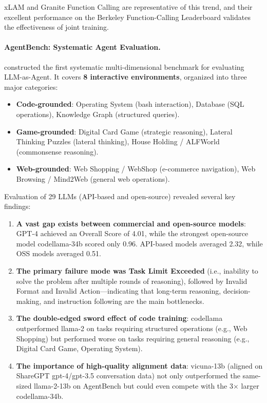 xLAM \citep{zhang2024xlam} and Granite Function Calling \citep{abdelaziz2024granite}
are representative of this trend,
and their excellent performance on the Berkeley Function-Calling Leaderboard
validates the effectiveness of joint training.

\paragraph{AgentBench: Systematic Agent Evaluation.}
 constructed the first systematic multi-dimensional benchmark for evaluating LLM-as-Agent. It covers \textbf{8 interactive environments}, organized into three major categories:
\begin{itemize}[leftmargin=*]
  \item \textbf{Code-grounded}: Operating System (bash interaction), Database (SQL operations), Knowledge Graph (structured queries).
  \item \textbf{Game-grounded}: Digital Card Game (strategic reasoning), Lateral Thinking Puzzles (lateral thinking), House Holding / ALFWorld (commonsense reasoning).
  \item \textbf{Web-grounded}: Web Shopping / WebShop (e-commerce navigation), Web Browsing / Mind2Web (general web operations).
\end{itemize}

Evaluation of 29 LLMs (API-based and open-source) revealed several key findings:
\begin{enumerate}[leftmargin=*]
  \item \textbf{A vast gap exists between commercial and open-source models}: GPT-4 achieved an Overall Score of 4.01, while the strongest open-source model codellama-34b scored only 0.96. API-based models averaged 2.32, while OSS models averaged 0.51.
  \item \textbf{The primary failure mode was Task Limit Exceeded} (i.e., inability to solve the problem after multiple rounds of reasoning), followed by Invalid Format and Invalid Action---indicating that long-term reasoning, decision-making, and instruction following are the main bottlenecks.
  \item \textbf{The double-edged sword effect of code training}: codellama outperformed llama-2 on tasks requiring structured operations (e.g., Web Shopping) but performed worse on tasks requiring general reasoning (e.g., Digital Card Game, Operating System).
  \item \textbf{The importance of high-quality alignment data}: vicuna-13b (aligned on ShareGPT gpt-4/gpt-3.5 conversation data) not only outperformed the same-sized llama-2-13b on AgentBench but could even compete with the 3$\times$ larger codellama-34b.
\end{enumerate}

